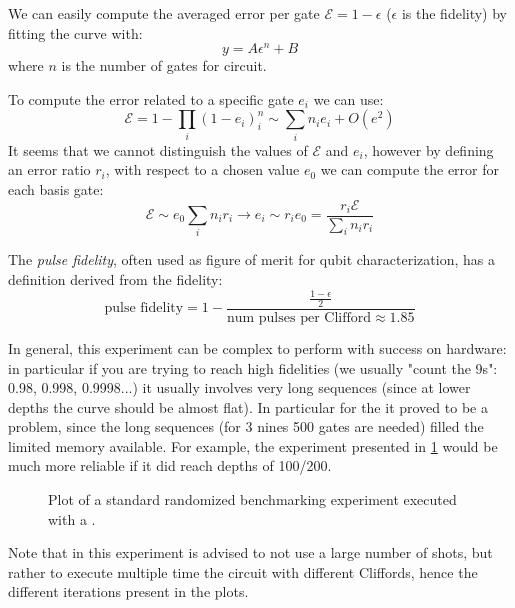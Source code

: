 We can easily compute the averaged error per gate $\mathcal E=1-\epsilon$ ($\epsilon$ is the fidelity) by fitting the curve with:
\begin{equation}
    y = A\epsilon^{n} + B
\end{equation}
where $n$ is the number of gates for circuit.

To compute the error related to a specific gate $e_i$ we can use:
\begin{equation}
    \mathcal E = 1 - \prod_i(1-e_i)^n_i \sim \sum_i n_i e_i + O(e^2)
\end{equation}
It seems that we cannot distinguish the values of $\mathcal E$ and $e_i$, however by defining an error ratio $r_i$, with respect to a chosen value $e_0$ we can compute the error for each basis gate:
\begin{equation}
    \mathcal E \sim e_0 \sum_i n_i r_i \rightarrow e_i \sim r_i e_0 = \frac{r_i \mathcal E}{\sum_i n_i r_i}
\end{equation}

The \textit{pulse fidelity}, often used as figure of merit for qubit characterization, has a definition derived from the fidelity:
\begin{equation}
    \text{pulse fidelity} = 1-\frac{\frac{1-\epsilon}{2}}{\text{num pulses per Clifford}\approx1.85}
\end{equation}

In general, this experiment can be complex to perform with success on hardware: in particular if you are trying to reach high fidelities (we usually "count the 9s": 0.98, 0.998, 0.9998...) it usually involves very long sequences (since at lower depths the curve should be almost flat).
In particular for the \RFSoC it proved to be a problem, since the long sequences (for 3 nines 500 gates are needed) filled the limited memory available.
For example, the experiment presented in \cref{fig:rb_short} would be much more reliable if it did reach depths of 100/200.

\begin{figure}[ht]
    \centering
    \caption{Plot of a standard randomized benchmarking experiment executed with a \RFSoC.}
    \label{fig:rb_short}
\end{figure}

Note that in this experiment is advised to not use a large number of shots, but rather to execute multiple time the circuit with different Cliffords, hence the different iterations present in the plots.


